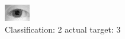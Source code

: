 \begin{figure}[h!]
\begin{center}
\includegraphics[width=0.60\columnwidth]{figures/ID1151_class_2_target_3.png}
\end{center}
\caption{ Classification: 2 actual target: 3}
\label{fig:ID1151_class_2_target_3}
\end{figure}
